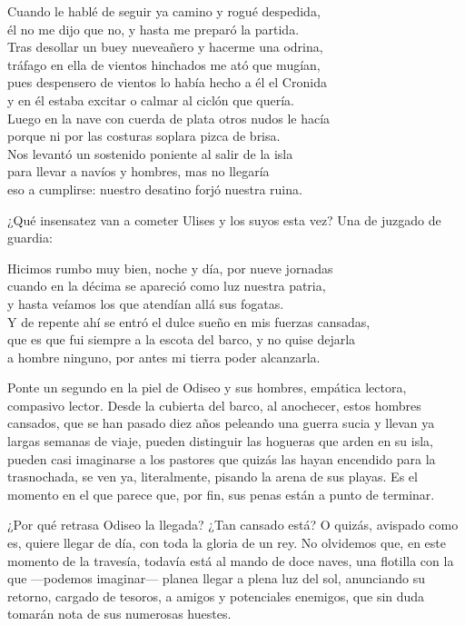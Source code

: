 \begin{versocita}
Cuando le hablé de seguir ya camino y rogué despedida,\\
él no me dijo que no, y hasta me preparó la partida.\\
Tras desollar un buey nueveañero y hacerme una odrina,\\
tráfago en ella de vientos hinchados me ató que mugían,\\
pues despensero de vientos lo había hecho a él el Cronida\\
y en él estaba excitar o calmar al ciclón que quería.\\
Luego en la nave con cuerda de plata otros nudos le hacía\\
porque ni por las costuras soplara pizca de brisa.\\
Nos levantó un sostenido poniente al salir de la isla\\
para llevar a navíos y hombres, mas no llegaría\\
eso a cumplirse: nuestro desatino forjó nuestra ruina.
\end{versocita}

¿Qué insensatez van a cometer Ulises y los suyos esta vez? Una de juzgado de guardia:

\begin{versocita}
Hicimos rumbo muy bien, noche y día, por nueve jornadas\\
cuando en la décima se apareció como luz nuestra patria,\\
y hasta veíamos los que atendían allá sus fogatas.\\
Y de repente ahí se entró el dulce sueño en mis fuerzas cansadas,\\
que es que fui siempre a la escota del barco, y no quise dejarla\\
a hombre ninguno, por antes mi tierra poder alcanzarla.
\end{versocita}

Ponte un segundo en la piel de Odiseo y sus hombres, empática lectora, compasivo lector. Desde la cubierta del barco, al anochecer, estos hombres cansados, que se han pasado diez años peleando una guerra sucia y llevan ya largas semanas de viaje, pueden distinguir las hogueras que arden en su isla, pueden casi imaginarse a los pastores que quizás las hayan encendido para la trasnochada, se ven ya, literalmente, pisando la arena de sus playas. Es el momento en el que parece que, por fin, sus penas están a punto de terminar.

¿Por qué retrasa Odiseo la llegada? ¿Tan cansado está? O quizás, avispado como es, quiere llegar de día, con toda la gloria de un rey. No olvidemos que, en este momento de la travesía, todavía está al mando de doce naves, una flotilla con la que ---podemos imaginar--- planea llegar a plena luz del sol, anunciando su retorno, cargado de tesoros, a amigos y potenciales enemigos, que sin duda tomarán nota de sus numerosas huestes.

